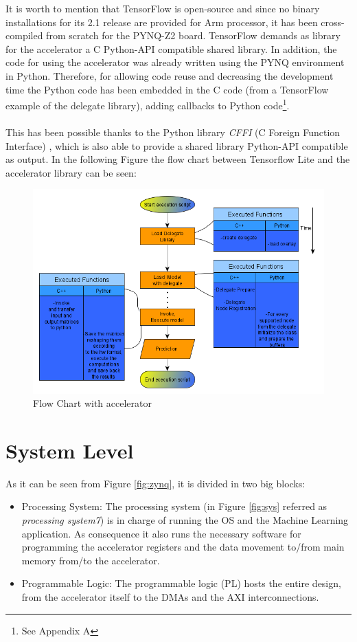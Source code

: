  It is worth to mention that TensorFlow is open-source and since no binary installations for its 2.1 release are provided for Arm processor, it has been cross-compiled from scratch for the PYNQ-Z2 board. 
 \newpage
TensorFlow demands as library for the accelerator a C Python-API compatible shared library. In addition, the code for using the accelerator was already written using the PYNQ environment in Python. Therefore, for allowing code reuse and decreasing the development time the Python code has been embedded in the C code (from a TensorFlow example of the delegate library), adding callbacks to Python code\footnote{See Appendix A}.\\\\ This has been possible thanks to the Python library \textit{CFFI} (C Foreign Function Interface) \cite{WEBSITE:14}, which is also able to provide a shared library Python-API compatible as output. In the following Figure the flow chart between Tensorflow Lite and the accelerator library can be seen:
\begin{figure}[!htbp]
\centering
\captionsetup{justification=centering}
\includegraphics[scale=0.6]{./figure/flow_chart_accelerator.png}
\caption{Flow Chart with accelerator}
\label{fig:fcaccelerator}
\end{figure}

\newpage
\section{System Level}

As it can be seen from Figure \ref{fig:zynq}, it is divided in two big blocks:
\begin{itemize}
\item Processing System:
The processing system (in Figure \ref{fig:sys} referred as \textit{processing system7}) is in charge of running the OS and the Machine Learning application. As consequence it also runs the necessary software for programming the accelerator registers and the data movement to/from main memory from/to the accelerator.
\item Programmable Logic:
The programmable logic (PL) hosts the entire design, from the accelerator itself to the DMAs and the AXI interconnections.
\end{itemize}

